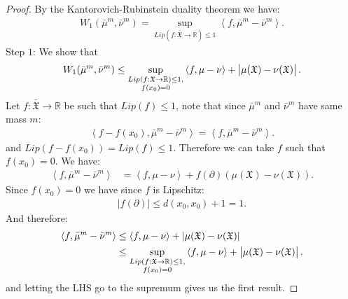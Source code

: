 \documentclass[11pt,a4paper]{article}
\newcommand{\RR}{\mathbb{R}}
\newcommand{\XF}{\mathfrak{X}}
\newcommand{\brac}[1]{\left\langle#1\right\rangle}
\begin{document}
\begin{proof}
     By the Kantorovich-Rubinstein duality theorem we have:
    \begin{align*}
        W_1(\bar{\mu}^m,\bar{\nu}^m) = \sup\limits_{Lip(f:\bar{\XF} \to \RR) \leq 1} \brac{f,\bar{\mu}^m - \bar{\nu}^m} .
    \end{align*}
    Step $1$: We show that
    \begin{align*}
        W_1(\bar{\mu}^m,\bar{\nu}^m) \leq  \sup\limits_{\substack{Lip(f:\XF \to \RR) \leq 1,\\ f(x_0) = 0}} \brac{f,\mu - \nu} + \left|\vphantom{A^2}\mu(\XF) - \nu(\XF) \right|.
    \end{align*}
    Let $f: \bar{\XF} \to \RR$ be such that $Lip(f)\leq 1$, note that since $\bar{\mu}^m$ and $\bar{\nu}^m$ have same mass $m$:
    \begin{align*}
         \brac{f -f(x_0),\bar{\mu}^m - \bar{\nu}^m} =  \brac{f,\bar{\mu}^m - \bar{\nu}^m}.
    \end{align*}
    and $Lip(f-f(x_0)) = Lip(f) \leq 1$. Therefore we can take $f$ such that $f(x_0) = 0$. We have:
    \begin{align*}
       \brac{f,\bar{\mu}^m - \bar{\nu}^m} 
       &= \brac{f,\mu - \nu} + f(\partial)\left( \mu(\XF) - \nu(\XF)\right).
    \end{align*}
    Since $f(x_0) = 0$ we have since $f$ is Lipschitz:
    \begin{align*}
        \left| f(\partial) \right| \leq d(x_0,x_0) + 1 = 1.
    \end{align*}
    And therefore:
    \begin{align*}
        \brac{f,\bar{\mu}^m - \bar{\nu}^m}  
        &\leq \brac{f,\mu - \nu} + \left| \mu(\XF) - \nu(\XF)\right|\\
        &\leq  \sup\limits_{\substack{Lip(f:\XF \to \RR) \leq 1,\\ f(x_0) = 0}} \brac{f,\mu - \nu} + \left|\vphantom{A^2}\mu(\XF) - \nu(\XF) \right|.
    \end{align*}
    and letting the LHS go to the supremum gives us the first result.


\end{proof}
\end{document}
